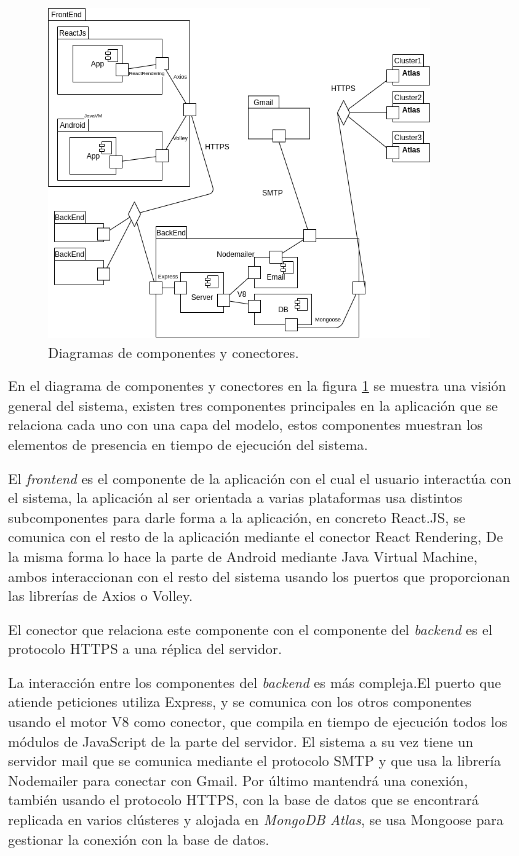 \documentclass{article}
\begin{document}
\begin{figure}[H]
   \centering
       \includegraphics[width=0.90\textwidth]{../images/cyc.png}
   \caption{Diagramas de componentes y conectores.}
   \label{cyc}
\end{figure}
 
En el diagrama de componentes y conectores en la figura \ref{cyc} se muestra una visión general del sistema, existen tres componentes principales en la aplicación que se relaciona cada uno con una capa del modelo, estos componentes muestran los elementos de presencia en tiempo de ejecución del sistema.
 
El \textit{frontend} es el componente de la aplicación con el cual el usuario interactúa con el sistema, la aplicación al ser orientada a varias plataformas usa distintos subcomponentes para darle forma a la aplicación, en concreto React.JS, se comunica con el resto de la aplicación mediante el conector React Rendering, De la misma forma lo hace la parte de Android mediante Java Virtual Machine, ambos interaccionan con el resto del sistema usando los puertos que proporcionan las librerías de Axios o Volley.
 
El conector que relaciona este componente con el componente del \textit{backend} es el protocolo HTTPS a una réplica del servidor.
 
La interacción entre los componentes del \textit{backend} es más compleja.El puerto que atiende peticiones utiliza Express, y se comunica con los otros componentes usando el motor V8 como conector, que compila en tiempo de ejecución todos los módulos de JavaScript de la parte del servidor. El sistema a su vez tiene un servidor mail que se comunica mediante el protocolo SMTP y que usa la librería Nodemailer para conectar con Gmail. Por último mantendrá una conexión, también usando el protocolo HTTPS, con la base de datos que se encontrará replicada en varios clústeres y alojada en \textit{MongoDB Atlas}, se usa Mongoose para gestionar la conexión con la base de datos.
 
\end{document}
